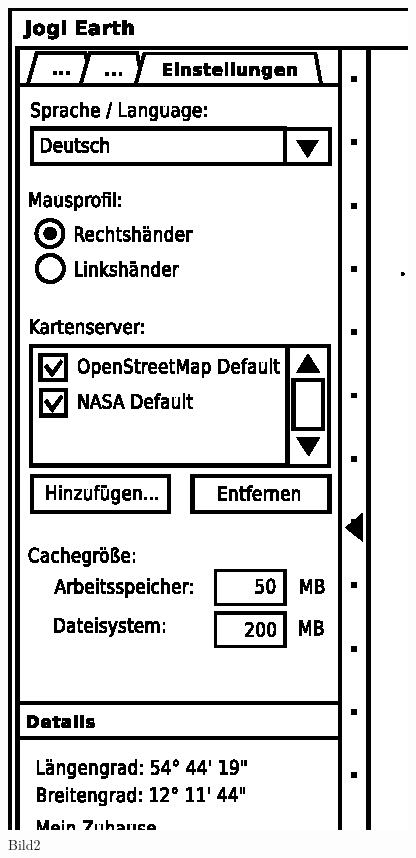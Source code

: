 \begin{figure}
\begin{minipage}[c]{5cm}
	\centering
\includegraphics[scale=0.9]{GUI-Einstellungen.eps}
\end{minipage}
	\caption{Bild2}
	\label{Bild2}
	\end{figure}